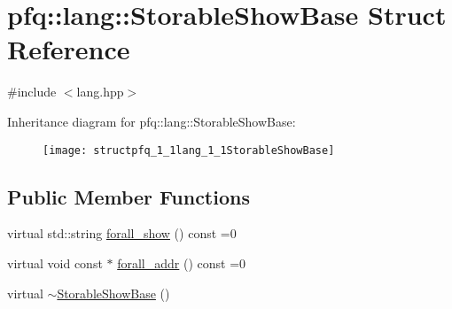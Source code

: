 \hypertarget{structpfq_1_1lang_1_1StorableShowBase}{\section{pfq\+:\+:lang\+:\+:Storable\+Show\+Base Struct Reference}
\label{structpfq_1_1lang_1_1StorableShowBase}
}


{\ttfamily \#include $<$lang.\+hpp$>$}

Inheritance diagram for pfq\+:\+:lang\+:\+:Storable\+Show\+Base\+:\begin{figure}[H]
\begin{center}
\leavevmode
\texttt{[image: structpfq\_1\_1lang\_1\_1StorableShowBase]}
\end{center}
\end{figure}
\subsection*{Public Member Functions}
\begin{DoxyCompactItemize}
\item 
virtual std\+::string \hyperlink{structpfq_1_1lang_1_1StorableShowBase_a1c6d20492a999c961c1120dce33a131d}{forall\+\_\+show} () const =0
\item 
virtual void const $\ast$ \hyperlink{structpfq_1_1lang_1_1StorableShowBase_a4b7712509609a2cb18dccf6b699d6ed9}{forall\+\_\+addr} () const =0
\item 
virtual \hyperlink{structpfq_1_1lang_1_1StorableShowBase_a8d4e90f7d227a8f5c0ca14ed7bdd0b5f}{$\sim$\+Storable\+Show\+Base} ()
\end{DoxyCompactItemize}
